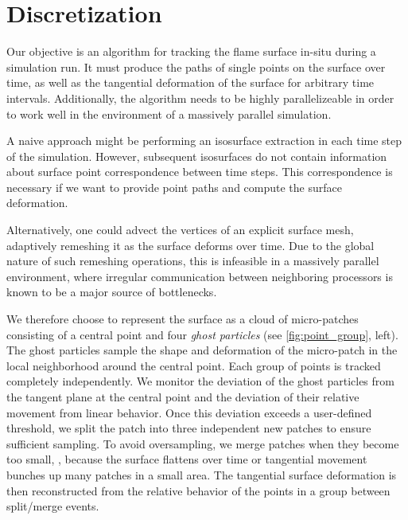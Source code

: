 \section{Discretization} %
\label{sec:fst_discretization}
%
Our objective is an algorithm for tracking the flame surface in-situ during a
simulation run.
%
It must produce the paths of single points on the surface over time, as well as
the tangential deformation of the surface for arbitrary time intervals.
%
Additionally, the algorithm needs to be highly parallelizeable in order to work
well in the environment of a massively parallel simulation.
%

%
A naive approach might be performing an isosurface extraction in each time step
of the simulation.
%
However, subsequent isosurfaces do not contain information about surface point
correspondence between time steps.
%
This correspondence is necessary if we want to provide point paths and compute
the surface deformation.
%

%
Alternatively, one could advect the vertices of an explicit surface mesh,
adaptively remeshing it as the surface deforms over time.
%
Due to the global nature of such remeshing operations, this is infeasible in a
massively parallel environment, where irregular communication between
neighboring processors is known to be a major source of bottlenecks.
%

%
We therefore choose to represent the surface as a cloud of micro-patches
consisting of a central point and four \textit{ghost particles} (see
\cref{fig:point_group}, left).
%
The ghost particles sample the shape and deformation of the micro-patch in the
local neighborhood around the central point.
%
Each group of points is tracked completely independently.
%
We monitor the deviation of the ghost particles from the tangent plane at the
central point and the deviation of their relative movement from linear behavior.
%
Once this deviation exceeds a user-defined threshold, we split the patch into
three independent new patches to ensure sufficient sampling.
%
To avoid oversampling, we merge patches when they become too small, \eg, because
the surface flattens over time or tangential movement bunches up
many patches in a small area.
%
The tangential surface deformation is then reconstructed from the relative
behavior of the points in a group between split/merge events.
%

%
